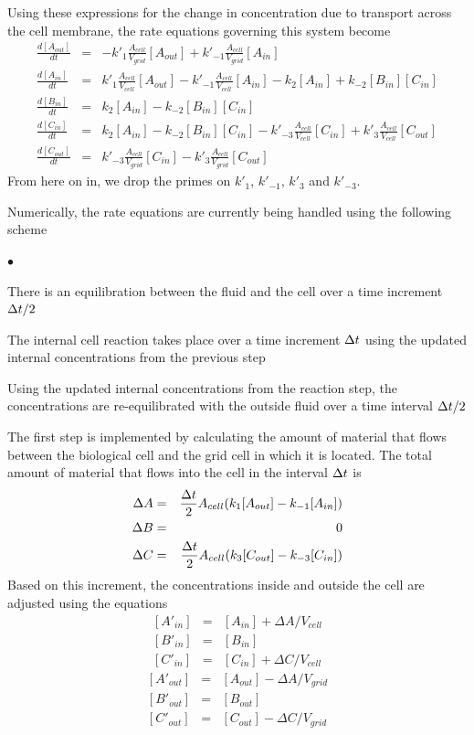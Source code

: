 \documentclass[12pt]{article}
\begin{document}
Using these expressions for the change in concentration due to transport across the cell membrane, the
rate equations governing this system become
\begin{eqnarray*}
\frac{d [A_{out}]}{d t} &=&-k'_1\frac{A_{cell}}{V_{grid}} [A_{out}]
+k'_{-1}\frac{A_{cell}}{V_{grid}} [A_{in}] \\
\frac{d [A_{in}]}{d t} &=&k'_1\frac{A_{cell}}{V_{cell}} [A_{out}]
-k'_{-1}\frac{A_{cell}}{V_{cell}} [A_{in}] - k_2 [A_{in}]
 + k_{-2}[B_{in}][C_{in}]\\
\frac{d [B_{in}]}{d t} &=&k_2 [A_{in}] - k_{-2}[B_{in}][C_{in}]\\
\frac{d [C_{in}]}{d t} &=&k_2 [A_{in}] - k_{-2}[B_{in}][C_{in}]
-k'_{-3} \frac{A_{cell}}{V_{cell}}[C_{in}]
+ k'_3\frac{A_{cell}}{V_{cell}} [C_{out}] \\
\frac{d [C_{out}]}{d t} &=&k'_{-3} \frac{A_{cell}}{V_{grid}}[C_{in}]
-k'_3\frac{A_{cell}}{V_{grid}} [C_{out}]
\end{eqnarray*}
From here on in, we drop the primes on $k'_1$, $k'_{-1}$, $k'_3$ and $k'_{-3}$.

Numerically, the rate equations are currently being handled using the following scheme
\begin{list}{$\bullet$}{}
\item There is an equilibration between the fluid and the cell over a time
increment $\Delta t/2$
\item The internal cell reaction takes place over a time increment $\Delta t$
using the updated internal concentrations from the previous step
\item Using the updated internal concentrations from the reaction step, the
concentrations are re-equilibrated with the outside fluid over a time interval
$\Delta t/2$
\end{list}
The first step is implemented by calculating the amount of material that flows
between the biological cell and the grid cell in which it is located.
The total amount of
material that flows into the cell in the interval $\Delta t$ is
\begin{eqnarray*}
\Delta A & = & \frac{\Delta t}{2} A_{cell}(k_1 [A_{out}]-k_{-1} [A_{in}]) \\
\Delta B & = & 0 \\
\Delta C & = & \frac{\Delta t}{2} A_{cell}(k_3 [C_{out}]-k_{-3} [C_{in}]) \\
\end{eqnarray*}
Based on this increment, the concentrations inside and outside the cell are
adjusted using the equations
\begin{eqnarray}
\nonumber
[A'_{in}] &=& [A_{in}] + \Delta A/V_{cell} \\
\nonumber
[B'_{in}]  &=& [B_{in}] \\
\nonumber
[C'_{in}] &=& [C_{in}] + \Delta C/V_{cell}
\end{eqnarray}
\begin{eqnarray}
\nonumber
[A'_{out}] &=& [A_{out}] - \Delta A/V_{grid} \\
\nonumber
[B'_{out}]  & = & [B_{out}] \\
\nonumber
[C'_{out}] &=& [C_{out}] - \Delta C/V_{grid}
\end{eqnarray}
\end{document}
